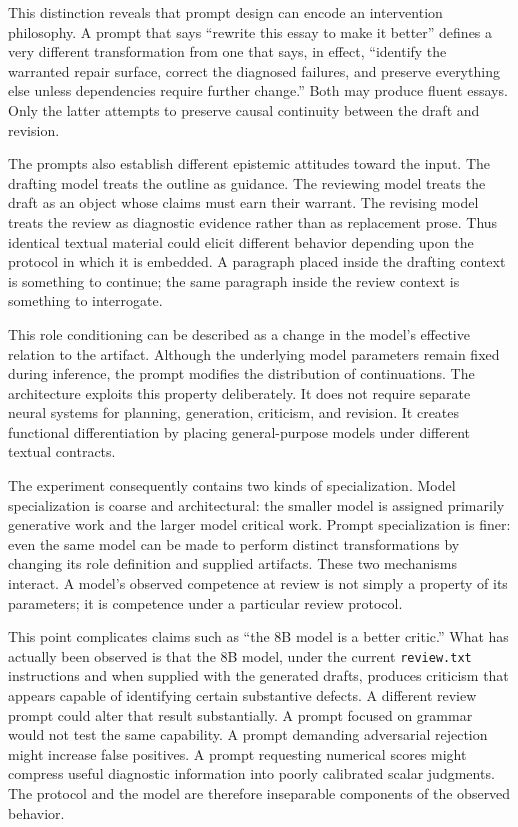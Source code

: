 \documentclass[11pt]{article}
\begin{document}
This distinction reveals that prompt design can encode an intervention philosophy. A prompt that says ``rewrite this essay to make it better'' defines a very different transformation from one that says, in effect, ``identify the warranted repair surface, correct the diagnosed failures, and preserve everything else unless dependencies require further change.'' Both may produce fluent essays. Only the latter attempts to preserve causal continuity between the draft and revision.

The prompts also establish different epistemic attitudes toward the input. The drafting model treats the outline as guidance. The reviewing model treats the draft as an object whose claims must earn their warrant. The revising model treats the review as diagnostic evidence rather than as replacement prose. Thus identical textual material could elicit different behavior depending upon the protocol in which it is embedded. A paragraph placed inside the drafting context is something to continue; the same paragraph inside the review context is something to interrogate.

This role conditioning can be described as a change in the model's effective relation to the artifact. Although the underlying model parameters remain fixed during inference, the prompt modifies the distribution of continuations. The architecture exploits this property deliberately. It does not require separate neural systems for planning, generation, criticism, and revision. It creates functional differentiation by placing general-purpose models under different textual contracts.

The experiment consequently contains two kinds of specialization. Model specialization is coarse and architectural: the smaller model is assigned primarily generative work and the larger model critical work. Prompt specialization is finer: even the same model can be made to perform distinct transformations by changing its role definition and supplied artifacts. These two mechanisms interact. A model's observed competence at review is not simply a property of its parameters; it is competence under a particular review protocol.

This point complicates claims such as ``the 8B model is a better critic.'' What has actually been observed is that the 8B model, under the current \texttt{review.txt} instructions and when supplied with the generated drafts, produces criticism that appears capable of identifying certain substantive defects. A different review prompt could alter that result substantially. A prompt focused on grammar would not test the same capability. A prompt demanding adversarial rejection might increase false positives. A prompt requesting numerical scores might compress useful diagnostic information into poorly calibrated scalar judgments. The protocol and the model are therefore inseparable components of the observed behavior.
\end{document}
